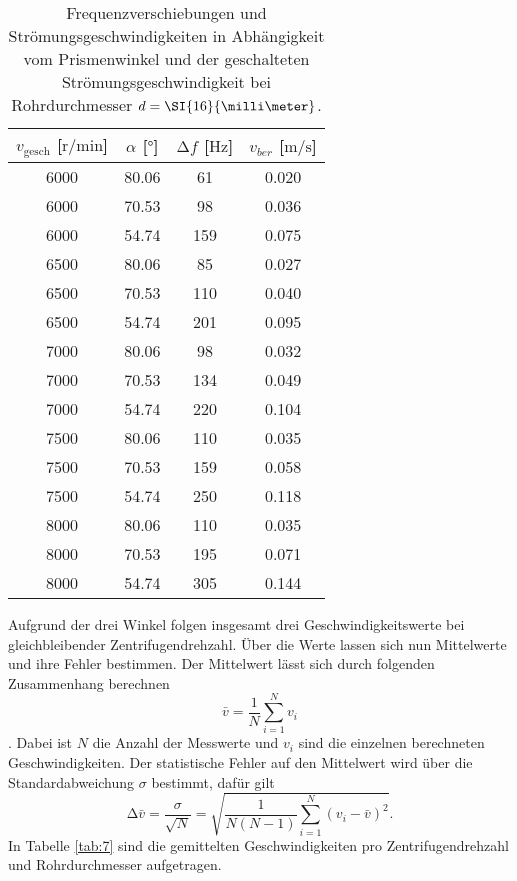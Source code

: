\begin{table}
    \centering
    \caption{Frequenzverschiebungen und Strömungsgeschwindigkeiten in Abhängigkeit vom Prismenwinkel und der geschalteten Strömungsgeschwindigkeit bei Rohrdurchmesser $\protect d = \SI{16}{\milli\meter}$.}
    \label{tab:6}
    \begin{tabular}{c c c c}
        \toprule
        $v_{\text{gesch}}$ [$\si{{\text{r}}\per\minute}$]  & $\alpha$ [$\si{\degree}$]  & $\increment f$ [$\si{\hertz}$] & $v_{ber}$ [$\si{\meter\per\second}$]\\
        \midrule
        6000    &   80.06    & 61   & 0.020 \\ 
        6000    &   70.53    & 98   & 0.036 \\ 
        6000    &   54.74    & 159  & 0.075 \\ 
        \midrule
        6500    &   80.06   & 85    & 0.027 \\ 
        6500    &   70.53   & 110   & 0.040 \\ 
        6500    &   54.74   & 201   & 0.095 \\ 
        \midrule
        7000    &   80.06   & 98    & 0.032 \\ 
        7000    &   70.53   & 134   & 0.049 \\ 
        7000    &   54.74   & 220   & 0.104 \\ 
        \midrule
        7500    &   80.06   & 110   & 0.035 \\ 
        7500    &   70.53   & 159   & 0.058 \\ 
        7500    &   54.74   & 250   & 0.118 \\ 
        \midrule
        8000    &   80.06   & 110   & 0.035 \\ 
        8000    &   70.53   & 195   & 0.071 \\ 
        8000    &   54.74   & 305   & 0.144 \\ 
        \bottomrule
    \end{tabular}
\end{table}   
                            
Aufgrund der drei Winkel folgen insgesamt drei Geschwindigkeitswerte bei gleichbleibender Zentrifugendrehzahl. Über die Werte lassen sich nun Mittelwerte und ihre Fehler bestimmen.
Der Mittelwert lässt sich durch folgenden Zusammenhang berechnen
\begin{equation}
    \label{eqn:mittel}
\bar{v} = \frac{1}{N} \sum_{i=1}^{N} v_{i}
\end{equation}.
Dabei ist $N$ die Anzahl der Messwerte und $v_{i}$ sind die einzelnen berechneten Geschwindigkeiten.
Der statistische Fehler auf den Mittelwert wird über die Standardabweichung $\sigma$ bestimmt, dafür gilt
\begin{equation}
    \label{eqn:sem}
\increment \bar{v} = \frac{\sigma}{\sqrt{N}} = \sqrt{\frac{1}{N(N-1)} \sum_{i=1}^{N} (v_{i} - \bar{v})^{2}}.
\end{equation}                                       
In Tabelle \ref{tab:7} sind die gemittelten Geschwindigkeiten pro Zentrifugendrehzahl und Rohrdurchmesser aufgetragen.

